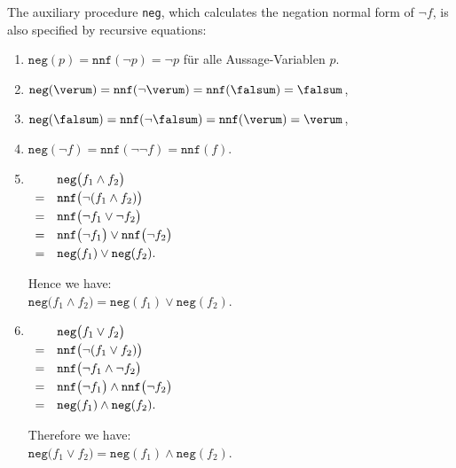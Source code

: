 The auxiliary procedure \texttt{neg}, which calculates the negation normal form of $\neg f$,
is also specified by recursive equations: 
\begin{enumerate}
\item $\texttt{neg}(p) = \texttt{nnf}(\neg p) = \neg p$ für alle Aussage-Variablen $p$.
\item $\texttt{neg}(\verum) = \texttt{nnf}(\neg\verum) = \texttt{nnf}(\falsum) = \falsum$, 
\item $\texttt{neg}(\falsum) = \texttt{nnf}(\neg\falsum) = \texttt{nnf}(\verum) = \verum$,
\item $\texttt{neg}(\neg f) = \texttt{nnf}(\neg \neg f) = \texttt{nnf}(f)$.
\item $\begin{array}[t]{cl}
         & \texttt{neg}\bigl(f_1 \wedge f_2 \bigr) \\[0.1cm]
       = & \texttt{nnf}\bigl(\neg(f_1 \wedge f_2)\bigr) \\[0.1cm]
       = & \texttt{nnf}\bigl(\neg f_1 \vee \neg f_2\bigr) \\[0.1cm]
       = & \texttt{nnf}\bigl(\neg f_1\bigr) \vee \texttt{nnf}\bigl(\neg f_2\bigr) \\[0.1cm]
       = & \texttt{neg}(f_1) \vee \texttt{neg}(f_2).
       \end{array}
      $

      Hence we have:
      \\[0.2cm]
      \hspace*{1.3cm}
      $\texttt{neg}\bigl(f_1 \wedge f_2 \bigr) = \texttt{neg}(f_1) \vee \texttt{neg}(f_2)$.
\item $\begin{array}[t]{cl}
         & \texttt{neg}\bigl(f_1 \vee f_2 \bigr)        \\[0.1cm]
       = & \texttt{nnf}\bigl(\neg(f_1 \vee f_2) \bigr)  \\[0.1cm]
       = & \texttt{nnf}\bigl(\neg f_1 \wedge \neg f_2 \bigr)  \\[0.1cm]
       = & \texttt{nnf}\bigl(\neg f_1\bigr) \wedge \texttt{nnf}\bigl(\neg f_2 \bigr)  \\[0.1cm]
       = & \texttt{neg}(f_1) \wedge \texttt{neg}(f_2). 
       \end{array}
      $

      Therefore we have: 
      \\[0.2cm]
      \hspace*{1.3cm}
      $\texttt{neg}\bigl(f_1 \vee f_2 \bigr) = \texttt{neg}(f_1) \wedge \texttt{neg}(f_2)$.
\end{enumerate}

